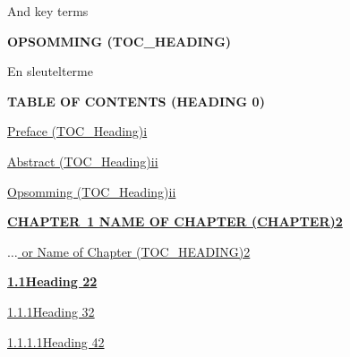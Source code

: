 \documentclass[12pt]{report}
\begin{document}
And key terms\par




\newpage

\vspace{\baselineskip}\begin{FlushLeft}
{\fontsize{14pt}{16.8pt}\selectfont \textbf{\uppercase{Opsomming (TOC\_Heading)}}\par}
\end{FlushLeft}\par

En sleutelterme\par




\newpage

\vspace{\baselineskip}\begin{FlushLeft}
{\fontsize{14pt}{16.8pt}\selectfont \textbf{\uppercase{Table of contents (Heading 0)}}\par}
\end{FlushLeft}\par

\href{}{Preface (TOC\_Heading)i}\par

\href{}{Abstract (TOC\_Heading)ii}\par

\href{}{Opsomming (TOC\_Heading)ii}\par

\begin{FlushLeft}
\textbf{\uppercase{\href{}{Chapter\ 1  Name of chapter (Chapter)2}}}
\end{FlushLeft}\par

\href{}{$ \ldots $ or Name of Chapter (TOC\_HEADING)2}\par

\begin{FlushLeft}
\textbf{\href{}{1.1Heading 22}}
\end{FlushLeft}\par

\begin{FlushLeft}
\href{}{1.1.1Heading 32}
\end{FlushLeft}\par

\begin{FlushLeft}
\href{}{1.1.1.1Heading 42}
\end{FlushLeft}\par
\end{document}

